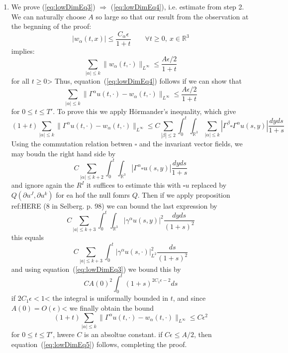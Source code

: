 \documentclass{book}
\newenvironment{Proof}[1][]
  {\begin{ProofTcb}[#1]}
  {\end{ProofTcb}}
\newcommand{\R}{{\mathbb{R}}}
\newcommand{\Rw}{\Rightarrow}
\begin{document}
\begin{Proof}
\begin{enumerate}
			\item We prove (\ref{eq:lowDimEq3}) $\Rw$ (\ref{eq:lowDimEq4}), i.e. estimate from step 2. We
				can naturally choose $A$ so large so that our result from the observation at the
				begnning of the proof:
				\[
					|w_\alpha(t, x)| \le \frac{C_\alpha \epsilon}{1 + t} \qquad \forall t \ge 0,\ x \in \R^3
				\]
				implies:
				\[
					\sum_{|\alpha| \le k} \|w_\alpha(t, \cdot)\|_{L^\infty} \le
					\frac{A\epsilon/2}{1+t}
				\]
				for all $t \ge 0$> Thus, equation~(\ref{eq:lowDimEq4}) follows if we can show that
				\begin{equation}\label{eq:lowDimEq5}
				  \sum_{|\alpha| \le k} \| \Gamma^\alpha u(t, \cdot)
				  - w_\alpha(t,\cdot)\|_{L^\infty} \le \frac{A\epsilon/2}{1+t}
				\end{equation}
				for $0 \le t \le T'$. To prove this we apply H\"ormander's inequality, which give
				\[
					(1+t)\sum_{|\alpha| \le k} \|\Gamma^\alpha u(t, \cdot) - w_\alpha(t,
					\cdot)\|_{L^\infty} \le C \sum_{|\beta| \le 2} \int_0^t\int_{\R^3}
					\sum_{|\alpha| \le k} |\Gamma^\beta\square \Gamma^\alpha u(s,y)|
					\frac{dyds}{1+s}
				\]
				Using the commutation relation betwen $\square$ and the invariant vector fields, we may
				boudn the right hand side by
				\[
					C\sum_{|\alpha| \le k+2}\int_0^t\int_{\R^3} |\Gamma^\alpha \square
					u(s,y)|\frac{dyds}{1+s}
				\]
				and ignore again the $R^I$ it suffices to estimate this with $\square u$ replaced
				by $Q( \partial u^J, \partial u^k )$ for ea hof the null fomrs $Q$. Then if we apply
				proposition ref:HERE (8 in Selberg. p. 98) we can bound the last expression by
				\[
					C\sum_{|a| \le k+3}\int_0^t\int_{\R^3} |\gamma^\alpha u(s,y)|^2
					\frac{dyds}{(1+s)^2}
				\]
				this equals
				\[
					C\sum_{|a| \le k+3}\int_0^t |\gamma^\alpha u(s,\cdot)|_{L^2}^2
					\frac{ds}{(1+s)^2}
				\]
				and using equation~(\ref{eq:lowDimEq3}) we bound this by
				\[
					CA(0)^2\int_0^t (1+s)^{2C_1\epsilon -2} ds
				\]
				if $2C_1\epsilon < 1$< the integral is uniformally bounded in $t$, and since
				$A(0) = O(\epsilon)$< we finally obtain the bound
				\[
					(1+t) \sum_{|\alpha| \le k} \|\Gamma^\alpha u(t, \cdot)
					- w_\alpha(t,\cdot)\|_{L^\infty} \le C\epsilon^2
				\]
				for $0 \le t \le T'$, hwere $C$ is an absoltue constant. if $C\epsilon \le A/2$, then
				equation~(\ref{eq:lowDimEq5}) follows, completing the proof.
	\end{enumerate}
\end{Proof}

\end{document}
